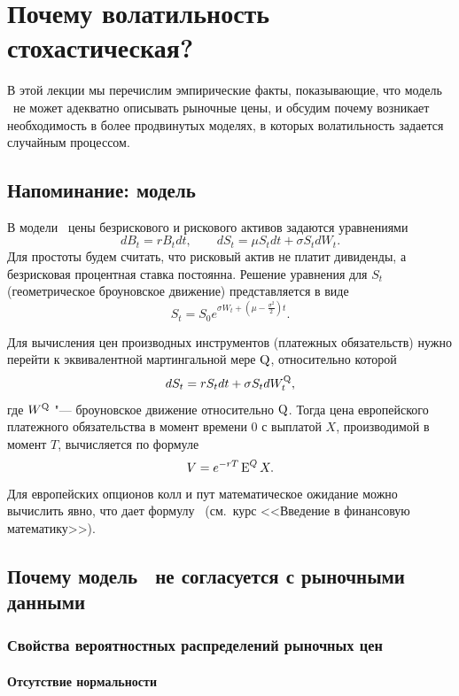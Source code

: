\chapter{Почему волатильность стохастическая?}
\chaptertoc

В этой лекции мы перечислим эмпирические факты, показывающие, что модель \bs\ не может адекватно описывать рыночные цены, и обсудим почему возникает необходимость в более продвинутых моделях, в которых волатильность задается случайным процессом.

\section{Напоминание: модель \bs}
В модели \bs\ цены безрискового и рискового активов задаются уравнениями
\[
d B_t = rB_t dt, \qquad
d S_t = \mu S_t dt + \sigma S_t d W_t.
\]
Для простоты будем считать, что рисковый актив не платит дивиденды, а безрисковая процентная ставка постоянна.
Решение уравнения для $S_t$ (геометрическое броуновское движение) представляется в виде
\[
S_t = S_0 e^{\sigma W_t + (\mu-\frac{\sigma^2}{2})t}.
\]

Для вычисления цен производных инструментов (платежных обязательств) нужно перейти к эквивалентной мартингальной мере $\mathrm{Q}$, относительно которой
\[
d S_t = r S_t dt + \sigma S_t d W_t^{\mathrm{Q}},
\]
где $W^{\mathrm{Q}}$ "--- броуновское движение относительно $\mathrm{Q}$.
Тогда цена европейского платежного обязательства в момент времени 0 с выплатой $X$, производимой  в момент $T$, вычисляется по формуле
\[
V = e^{-rT} \operatorname{E}^Q X.
\]
Для европейских опционов колл и пут математическое ожидание можно вычислить явно, что дает формулу \bs\ (см.~курс <<Введение в финансовую математику>>).


\section{Почему модель \bs\ не согласуется с рыночными данными}
\subsection{Свойства вероятностных распределений рыночных цен}
\subsubsection{Отсутствие нормальности}

